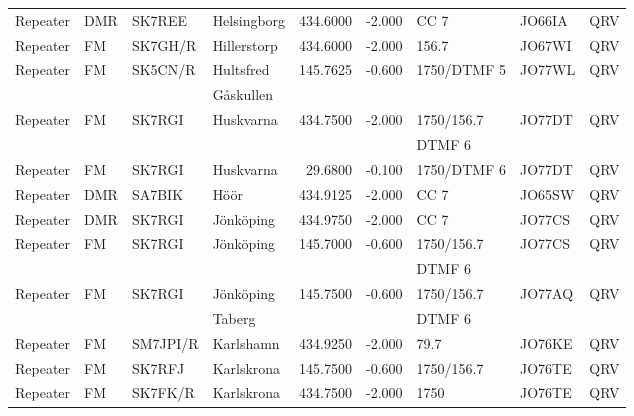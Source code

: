 \begin{landscape}
\begin{longtable}{llllrrlll}
Repeater & DMR             & SK7REE   & Helsingborg  & 434.6000     & -2.000     & CC 7         & JO66IA      & QRV      \\
Repeater & FM              & SK7GH/R  & Hillerstorp  & 434.6000     & -2.000     & 156.7        & JO67WI      & QRV      \\
Repeater & FM              & SK5CN/R  & Hultsfred    & 145.7625     & -0.600     & 1750/DTMF 5  & JO77WL      & QRV      \\
         &                 &          & Gåskullen    &              &            &              &             &          \\
Repeater & FM              & SK7RGI   & Huskvarna    & 434.7500     & -2.000     & 1750/156.7   & JO77DT      & QRV      \\
         &                 &          &              &              &            & DTMF 6       &             &          \\
Repeater & FM              & SK7RGI   & Huskvarna    & 29.6800      & -0.100     & 1750/DTMF 6  & JO77DT      & QRV      \\
Repeater & DMR             & SA7BIK   & Höör         & 434.9125     & -2.000     & CC 7         & JO65SW      & QRV      \\
Repeater & DMR             & SK7RGI   & Jönköping    & 434.9750     & -2.000     & CC 7         & JO77CS      & QRV      \\
Repeater & FM              & SK7RGI   & Jönköping    & 145.7000     & -0.600     & 1750/156.7   & JO77CS      & QRV      \\
         &                 &          &              &              &            & DTMF 6       &             &          \\
Repeater & FM              & SK7RGI   & Jönköping    & 145.7500     & -0.600     & 1750/156.7   & JO77AQ      & QRV      \\
         &                 &          & Taberg       &              &            & DTMF 6       &             &          \\
Repeater & FM              & SM7JPI/R & Karlshamn    & 434.9250     & -2.000     & 79.7         & JO76KE      & QRV      \\
Repeater & FM              & SK7RFJ   & Karlskrona   & 145.7500     & -0.600     & 1750/156.7   & JO76TE      & QRV      \\
Repeater & FM              & SK7FK/R  & Karlskrona   & 434.7500     & -2.000     & 1750         & JO76TE      & QRV      \\

\end{longtable}
\end{landscape}

